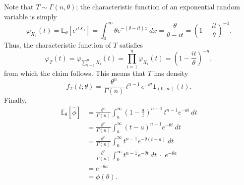 \documentclass[11pt]{article}
\begin{document}
\begin{enumerate}
\begin{enumerate}
        Note that $T \sim \Gamma(n, \theta)$; the characteristic function of
        an exponential random variable is simply \[
            \varphi_{X_1}(t)
                = \mathbb{E}_{\theta}\left[e^{itX_1}\right]
                = \int_0^\infty \theta e^{-(\theta - it)x} \:dx
                = \frac{\theta}{\theta - it}
                = \left(1 - \frac{it}{\theta}\right)^{-1}.
        \] Thus, the characteristic function of $T$ satisfies \[
            \varphi_T(t)
                = \varphi_{\sum_{i = 1}^n X_i}(t)
                = \prod_{i = 1}^n \varphi_{X_i}(t)
                = \left(1 - \frac{it}{\theta}\right)^{-n},
        \] from which the claim follows.
        This means that $T$ has density \[
            f_T(t; \theta) = \frac{\theta^n}{\Gamma(n)}\, t^{n - 1}\, e^{-\theta t} \bm{1}_{(0, \infty)}(t).
        \] Finally, \begin{align*}
            \mathbb{E}_\theta[\hat{\phi}]
                &= \frac{\theta^n}{\Gamma(n)} \int_a^\infty \left(1 - \frac{a}{t}\right)^{n - 1}\, t^{n - 1} e^{-\theta t} \:dt \\
                &= \frac{\theta^n}{\Gamma(n)} \int_a^\infty (t - a)^{n - 1} e^{-\theta t} \:dt \\
                &= \frac{\theta^n}{\Gamma(n)} \int_0^\infty t^{n - 1} e^{-\theta (t + a)} \:dt \\
                &= \frac{\theta^n}{\Gamma(n)} \int_0^\infty t^{n - 1} e^{-\theta t} \:dt \;\cdot\; e^{-\theta a} \\
                &= e^{-\theta a} \\
                &= \phi(\theta).
        \end{align*}
    \end{enumerate}


    \end{enumerate}
\end{document}
